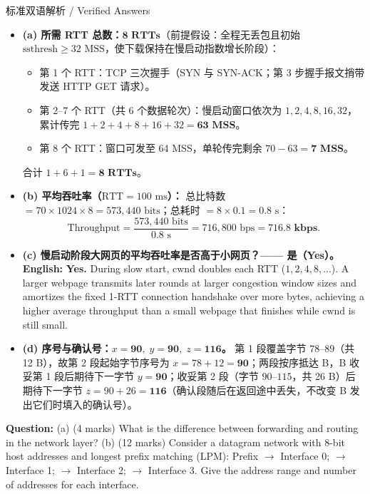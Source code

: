 \begin{StudySolution}{标准双语解析 / Verified Answers}
\begin{itemize}
\item \textbf{(a) 所需 RTT 总数：$\mathbf{8\text{ RTTs}}$}（前提假设：全程无丢包且初始 $\mathrm{ssthresh} \ge 32\text{ MSS}$，使下载保持在慢启动指数增长阶段）：
  \begin{itemize}
   \item 第 1 个 RTT：TCP 三次握手（SYN 与 SYN-ACK；第 3 步握手报文捎带发送 HTTP GET 请求）。
   \item 第 2–7 个 RTT（共 6 个数据轮次）：慢启动窗口依次为 $1, 2, 4, 8, 16, 32$，累计传完 $1 + 2 + 4 + 8 + 16 + 32 = \mathbf{63\text{ MSS}}$。
   \item 第 8 个 RTT：窗口可发至 64 MSS，单轮传完剩余 $70 - 63 = \mathbf{7\text{ MSS}}$。
  \end{itemize}
  合计 $1 + 6 + 1 = \mathbf{8\text{ RTTs}}$。
\item \textbf{(b) 平均吞吐率（$\mathrm{RTT}=100\text{ ms}$）：}
  总比特数 $= 70 \times 1024 \times 8 = 573{,}440\text{ bits}$；总耗时 $= 8 \times 0.1 = 0.8\text{ s}$：
  \[
  \mathrm{Throughput} = \frac{573{,}440\text{ bits}}{0.8\text{ s}} = 716{,}800\text{ bps} = \mathbf{716.8\text{ kbps}}. \tag{F.5}
  \]
\item \textbf{(c) 慢启动阶段大网页的平均吞吐率是否高于小网页？—— 是（Yes）。}
  \textbf{English:} \textbf{Yes.} During slow start, $\mathrm{cwnd}$ doubles each RTT ($1,2,4,8,\dots$). A larger webpage transmits later rounds at larger congestion window sizes and amortizes the fixed 1-RTT connection handshake over more bytes, achieving a higher average throughput than a small webpage that finishes while $\mathrm{cwnd}$ is still small.
\item \textbf{(d) 序号与确认号：$x = \mathbf{90},\; y = \mathbf{90},\; z = \mathbf{116}$。}
  第 1 段覆盖字节 $78\text{–}89$（共 12 B），故第 2 段起始字节序号为 $x = 78 + 12 = \mathbf{90}$；两段按序抵达 B，B 收妥第 1 段后期待下一字节 $y = \mathbf{90}$；收妥第 2 段（字节 $90\text{–}115$，共 26 B）后期待下一字节 $z = 90 + 26 = \mathbf{116}$（确认段随后在返回途中丢失，不改变 B 发出它们时填入的确认号）。
\end{itemize}
\end{StudySolution}



\textbf{Question:}
(a) (4 marks) What is the difference between forwarding and routing in the network layer?
(b) (12 marks) Consider a datagram network with 8-bit host addresses and longest prefix matching (LPM): Prefix  $\to$ Interface 0;  $\to$ Interface 1;  $\to$ Interface 2;  $\to$ Interface 3. Give the address range and number of addresses for each interface.

